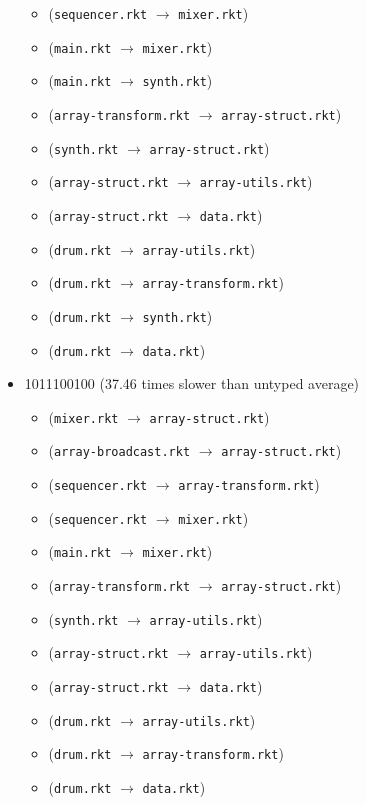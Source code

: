 \documentclass{article}
\newcommand{\mono}[1]{\texttt{#1}}
\begin{document}
\begin{itemize}
\begin{itemize}
  \item (\mono{sequencer.rkt} $\rightarrow$ \mono{mixer.rkt})
  \item (\mono{main.rkt} $\rightarrow$ \mono{mixer.rkt})
  \item (\mono{main.rkt} $\rightarrow$ \mono{synth.rkt})
  \item (\mono{array-transform.rkt} $\rightarrow$ \mono{array-struct.rkt})
  \item (\mono{synth.rkt} $\rightarrow$ \mono{array-struct.rkt})
  \item (\mono{array-struct.rkt} $\rightarrow$ \mono{array-utils.rkt})
  \item (\mono{array-struct.rkt} $\rightarrow$ \mono{data.rkt})
  \item (\mono{drum.rkt} $\rightarrow$ \mono{array-utils.rkt})
  \item (\mono{drum.rkt} $\rightarrow$ \mono{array-transform.rkt})
  \item (\mono{drum.rkt} $\rightarrow$ \mono{synth.rkt})
  \item (\mono{drum.rkt} $\rightarrow$ \mono{data.rkt})
  \end{itemize}
\item 1011100100 (37.46 times slower than untyped average)
  \begin{itemize}
  \item (\mono{mixer.rkt} $\rightarrow$ \mono{array-struct.rkt})
  \item (\mono{array-broadcast.rkt} $\rightarrow$ \mono{array-struct.rkt})
  \item (\mono{sequencer.rkt} $\rightarrow$ \mono{array-transform.rkt})
  \item (\mono{sequencer.rkt} $\rightarrow$ \mono{mixer.rkt})
  \item (\mono{main.rkt} $\rightarrow$ \mono{mixer.rkt})
  \item (\mono{array-transform.rkt} $\rightarrow$ \mono{array-struct.rkt})
  \item (\mono{synth.rkt} $\rightarrow$ \mono{array-utils.rkt})
  \item (\mono{array-struct.rkt} $\rightarrow$ \mono{array-utils.rkt})
  \item (\mono{array-struct.rkt} $\rightarrow$ \mono{data.rkt})
  \item (\mono{drum.rkt} $\rightarrow$ \mono{array-utils.rkt})
  \item (\mono{drum.rkt} $\rightarrow$ \mono{array-transform.rkt})
  \item (\mono{drum.rkt} $\rightarrow$ \mono{data.rkt})

\end{itemize}
\end{itemize}
\end{document}
